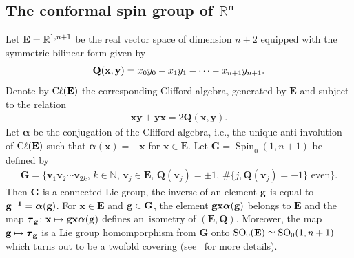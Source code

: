 \documentclass[10pt,a4paper]{amsart}
\DeclareMathOperator{\cl}{C\ell} %
\DeclareMathOperator{\Spin}{Spin}
\DeclareMathOperator{\SO}{SO}
\numberwithin{equation}{section}
\begin{document}
\subsection[The conformal spin group of Rn]{The conformal spin group of $\boldsymbol{\mathbb{R}^n}$}

Let ${\bf E} = \mathbb R^{1,n+1}$ be the real vector space of dimension $n+2$ equipped with the symmetric bilinear form given by
\begin{gather*}
{\bf Q}( {\mathbf x,\mathbf y }) = x_0y_0-x_1y_1-\dots -x_{n+1}y_{n+1} .
\end{gather*}
Denote by $\cl(\bf E)$ the corresponding Clifford algebra, generated by $\mathbf E$ and subject to the relation
\begin{gather*}
\mathbf x\mathbf y+ \mathbf y\mathbf x= 2\mathbf Q(\mathbf x, \mathbf y) .
\end{gather*}
Let $\boldsymbol \alpha$ be the conjugation of the Clifford algebra, i.e., the unique anti-involution of $\cl(\bf E)$ such that $ \boldsymbol \alpha(\mathbf x) = -\mathbf x$ for $\mathbf x\in\mathbf E$.
Let
$ {\mathbf G} = \Spin_0(1,n+1)$ be defined by
\begin{gather*}
\mathbf G=\big\{\mathbf v_1 \mathbf v_2\cdots \mathbf v_{2k},\,k\in \mathbb N,\, \mathbf v_j\in \mathbf E,\, \mathbf Q(\mathbf v_j) = \pm 1,\, \#\{j,\mathbf Q(\mathbf v_j) = -1\} \text{ even} \big\} .
\end{gather*}
Then $ {\mathbf G}$ is a connected Lie group,
 the inverse of an element $\bf g$ is equal to $\bf g^{-1} = \boldsymbol \alpha (g)$. For $\mathbf x\in \mathbf E$ and $\bf g\in \mathbf G$, the element $\bf g\mathbf x \boldsymbol \alpha(\bf g)$ belongs to $\mathbf E$ and the map $\boldsymbol \tau_{\bf g} \colon\mathbf x \mapsto\bf g\mathbf x \boldsymbol \alpha(\bf g)$ defines an~isometry of $(\mathbf E,\mathbf Q)$. Moreover, the map $ \bf g\mapsto\boldsymbol \tau_{\bf g}$ is a Lie group homomporphism from $\mathbf G$ onto $\SO_0({\bf E})\simeq \SO_0(1,n+1)$ which turns out to be a twofold covering (see~\cite{dss} for more details).
\end{document}
